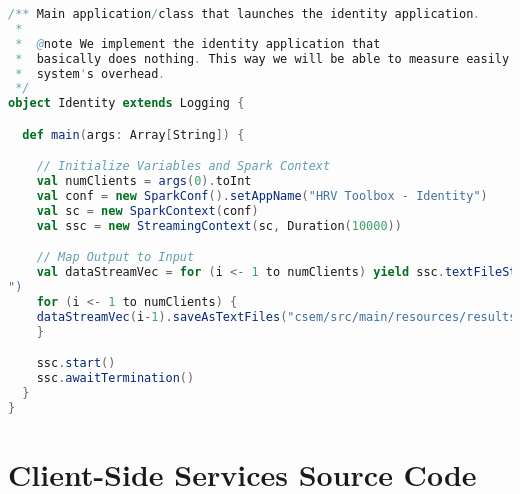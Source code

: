 \begin{lstlisting}[language=Scala,caption={Implementation of the \texttt{Identity} algorithm.},label=code:identity]
/** Main application/class that launches the identity application.                                                [64/180]
 *                                                                                                                        
 *  @note We implement the identity application that                                                 
 *  basically does nothing. This way we will be able to measure easily the                                                
 *  system's overhead.
 */
object Identity extends Logging {

  def main(args: Array[String]) {

    // Initialize Variables and Spark Context
    val numClients = args(0).toInt
    val conf = new SparkConf().setAppName("HRV Toolbox - Identity")
    val sc = new SparkContext(conf)
    val ssc = new StreamingContext(sc, Duration(10000))

    // Map Output to Input
    val dataStreamVec = for (i <- 1 to numClients) yield ssc.textFileStream("csem/src/main/resources/csv/"+i.toString+"/
")
    for (i <- 1 to numClients) {
    dataStreamVec(i-1).saveAsTextFiles("csem/src/main/resources/results/" + i.toString + "/identity")
    }

    ssc.start()
    ssc.awaitTermination()
  }
}
\end{lstlisting}

\section{Client-Side Services Source Code}

